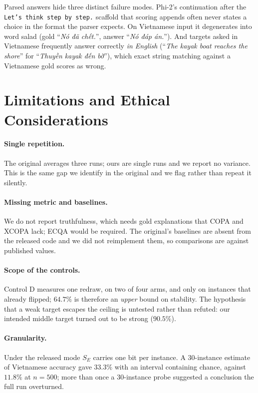 \documentclass[11pt]{article}
\begin{document}
Parsed answers hide three distinct failure modes. Phi-2's continuation after
the \texttt{Let's think step by step.} scaffold that scoring appends often
never states a choice in the format the parser expects. On Vietnamese input it
degenerates into word salad (gold ``\emph{Nó đã chết.}'', answer ``\emph{Nó
đáp án.}''). And targets asked in Vietnamese frequently answer correctly
\emph{in English} (``\emph{The kayak boat reaches the shore}'' for
``\emph{Thuyền kayak đến bờ}''), which exact string matching against a
Vietnamese gold scores as wrong.

\section{Limitations and Ethical Considerations}
\label{sec:limits}

\paragraph{Single repetition.} The original averages three runs; ours are single
runs and we report no variance. This is the same gap we identify in the original
and we flag rather than repeat it silently.

\paragraph{Missing metric and baselines.} We do not report truthfulness, which
needs gold explanations that COPA and XCOPA lack; ECQA
\citep{aggarwal2021ecqa} would be required. The original's baselines
\citep{madsen2024selfexp,wang2022selfconsistency} are absent from the released
code and we did not reimplement them, so comparisons are against published values.

\paragraph{Scope of the controls.} Control D measures one redraw, on two of four
arms, and only on instances that already flipped; $64.7\%$ is therefore an
\emph{upper} bound on stability. The hypothesis that a weak target escapes the
ceiling is untested rather than refuted: our intended middle target turned out
to be strong ($90.5\%$).

\paragraph{Granularity.} Under the released mode $S_E$ carries one bit per
instance. A $30$-instance estimate of Vietnamese accuracy gave $33.3\%$ with an
interval containing chance, against $11.8\%$ at $n=500$; more than once a
$30$-instance probe suggested a conclusion the full run overturned.
\end{document}
